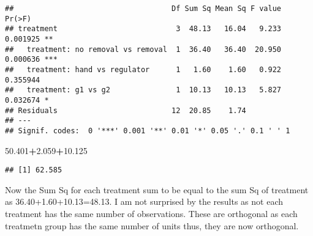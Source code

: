 \documentclass[]{article}
\newenvironment{Shaded}{\begin{snugshade}}{\end{snugshade}}
\newcommand{\FloatTok}[1]{\textcolor[rgb]{0.00,0.00,0.81}{#1}}
\newcommand{\OperatorTok}[1]{\textcolor[rgb]{0.81,0.36,0.00}{\textbf{#1}}}
\begin{document}
\begin{verbatim}
##                                    Df Sum Sq Mean Sq F value   Pr(>F)    
## treatment                           3  48.13   16.04   9.233 0.001925 ** 
##   treatment: no removal vs removal  1  36.40   36.40  20.950 0.000636 ***
##   treatment: hand vs regulator      1   1.60    1.60   0.922 0.355944    
##   treatment: g1 vs g2               1  10.13   10.13   5.827 0.032674 *  
## Residuals                          12  20.85    1.74                     
## ---
## Signif. codes:  0 '***' 0.001 '**' 0.01 '*' 0.05 '.' 0.1 ' ' 1
\end{verbatim}

\begin{Shaded}
\begin{Highlighting}[]
\FloatTok{50.401}\OperatorTok{+}\FloatTok{2.059}\OperatorTok{+}\FloatTok{10.125}
\end{Highlighting}
\end{Shaded}

\begin{verbatim}
## [1] 62.585
\end{verbatim}

Now the Sum Sq for each treatment sum to be equal to the sum Sq of
treatment as 36.40+1.60+10.13=48.13. I am not surprised by the results
as not each treatment has the same number of observations. These are
orthogonal as each treatmetn group has the same number of units thus,
they are now orthogonal.
\end{document}
